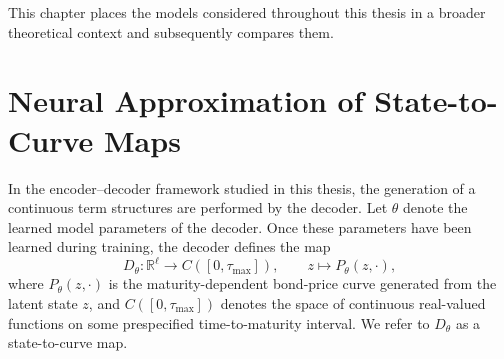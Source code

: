 



This chapter places the models considered throughout this thesis in a broader theoretical context and subsequently compares them. 



\section{Neural Approximation of State-to-Curve Maps}
\label{sec:state_to_curve_approximation}

In the encoder--decoder framework studied in this thesis, the generation of a continuous term structures are performed by the decoder. Let \(\theta\) denote the learned model parameters of the decoder. Once these parameters have been learned during training, the decoder defines the map
\[
    D_\theta:\mathbb{R}^{\ell}\to C([0,\tau_{\max}]),
    \qquad
    z\mapsto P_\theta(z,\cdot),
\]
where \(P_\theta(z,\cdot)\) is the maturity-dependent bond-price curve generated from the latent state \(z\), and \(C([0,\tau_{\max}])\) denotes the space of continuous real-valued functions on some prespecified time-to-maturity interval. We refer to \(D_\theta\) as a state-to-curve map.

